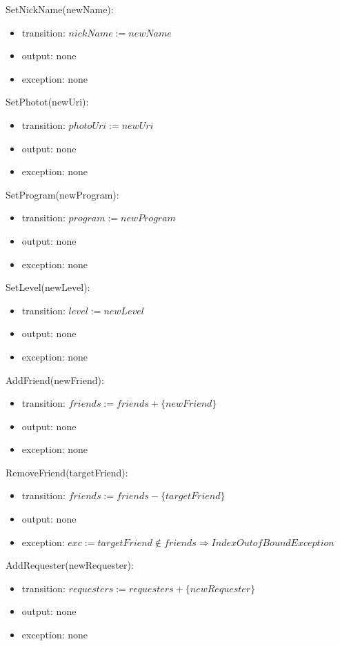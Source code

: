 \documentclass[12pt, titlepage]{article}
\begin{document}
\noindent SetNickName(newName):
\begin{itemize}
\item transition: $nickName := newName$
\item output: none
\item exception: none
\end{itemize}

\noindent SetPhotot(newUri):
\begin{itemize}
\item transition: $photoUri := newUri$
\item output: none
\item exception: none
\end{itemize}

\noindent SetProgram(newProgram):
\begin{itemize}
\item transition: $program := newProgram$
\item output: none
\item exception: none
\end{itemize}

\noindent SetLevel(newLevel):
\begin{itemize}
\item transition: $level := newLevel$
\item output: none
\item exception: none
\end{itemize}

\noindent AddFriend(newFriend):
\begin{itemize}
\item transition: $friends := friends + \{newFriend\}$
\item output: none
\item exception: none
\end{itemize}

\noindent RemoveFriend(targetFriend):
\begin{itemize}
\item transition: $friends := friends - \{targetFriend\}$
\item output: none
\item exception: $exc := targetFriend \notin friends \Rightarrow IndexOutofBound Exception$
\end{itemize}

\noindent AddRequester(newRequester):
\begin{itemize}
\item transition: $requesters := requesters + \{newRequester\}$
\item output: none
\item exception: none
\end{itemize}
\end{document}
